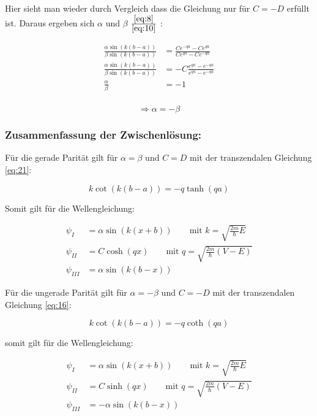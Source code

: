 Hier sieht man wieder durch Vergleich dass die Gleichung nur für \(C=-D\) erfüllt ist. Daraus ergeben sich \(\alpha\) und \(\beta\)  \(\frac{\eqref{eq:8}}{\eqref{eq:10}}\) :

\begin{align}
  \label{eq:23}
\frac{\alpha\sin(k(b-a))}{\beta\sin(k(b-a))} &= \frac{Ce^{-qa}-Ce^{qa}}{Ce^{qa}-Ce^{-qa}}\\
\frac{\alpha\sin(k(b-a))}{\beta\sin(k(b-a))} &= -C\frac{e^{qa}-e^{-qa}}{e^{qa}-e^{-qa}}\\
\frac{\alpha}{\beta} &= -1\\
\end{align}

\begin{equation}
  \label{eq:24}
 \Rightarrow  \alpha = -\beta
\end{equation}


\subsubsection{Zusammenfassung der Zwischenlösung:}

Für die gerade Parität gilt für \(\alpha=\beta\) und \(C=D\) mit der transzendalen Gleichung \eqref{eq:21}:

\begin{equation}
  \label{eq:25}
  \boxed{k\cot(k(b-a)) = -q \tanh(qa)}
\end{equation}

Somit gilt für die Wellengleichung:

\begin{align}
  \label{eq:26}
  \psi_{I} &= \alpha \sin(k(x+b))  \qquad \text{mit } k = \sqrt{\frac{2m}{\hbar}E}\\
  \psi_{II} &= C\cosh(qx) \qquad \text{mit } q = \sqrt{\frac{2m}{\hbar}(V-E)} \\
 \psi_{III} &= \alpha \sin(k(b-x))
\end{align}

Für die ungerade Parität gilt für \(\alpha=-\beta\) und \(C=-D\) mit der transzendalen Gleichung \eqref{eq:16}:

\begin{equation}
  \label{eq:27}
 \boxed{ k\cot(k(b-a)) = - q\coth(qa)}
\end{equation}

somit gilt für die Wellengleichung:

\begin{align}
  \label{eq:28}
  \psi_{I} &= \alpha \sin(k(x+b))  \qquad \text{mit } k = \sqrt{\frac{2m}{\hbar}E}\\
  \psi_{II} &= C\sinh(qx) \qquad \text{mit } q = \sqrt{\frac{2m}{\hbar}(V-E)} \\
 \psi_{III} &= -\alpha \sin(k(b-x))
\end{align}

